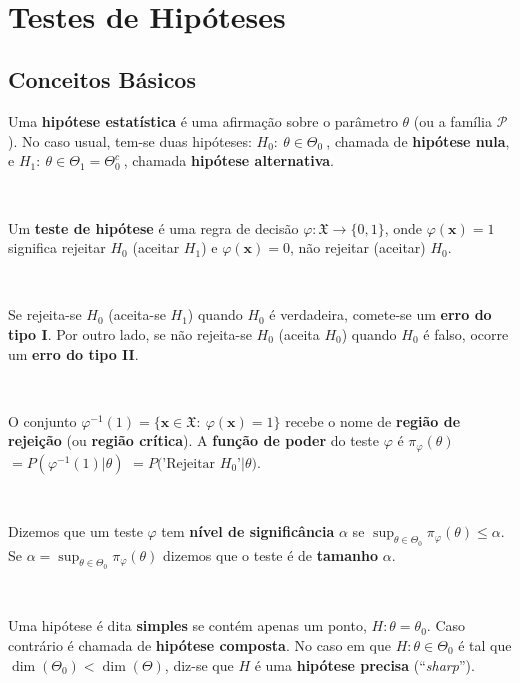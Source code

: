 \documentclass[
]{book}
\begin{document}
\(~\)

\hypertarget{Test}{%
\chapter{Testes de Hipóteses}\label{Test}}

\hypertarget{BasTest}{%
\section{Conceitos Básicos}\label{BasTest}}

Uma \textbf{hipótese estatística} é uma afirmação sobre o parâmetro \(\theta\) (ou a família \(\mathcal{P}\)). No caso usual, tem-se duas hipóteses: \(H_0: ~\theta\in\Theta_0~\), chamada de \textbf{hipótese nula}, e \(H_1: ~\theta\in\Theta_1={\Theta}_0^c~\), chamada \textbf{hipótese alternativa}.

\(~\)

Um \textbf{teste de hipótese} é uma regra de decisão \(\varphi: \mathfrak{X} \longrightarrow \{0,1\}\), onde \(\varphi(\boldsymbol{x})=1\) significa rejeitar \(H_0\) (aceitar \(H_1\)) e \(\varphi(\boldsymbol x)=0\), não rejeitar (aceitar) \(H_0\).

\(~\)

Se rejeita-se \(H_0\) (aceita-se \(H_1\)) quando \(H_0\) é verdadeira, comete-se um \textbf{erro do tipo I}. Por outro lado, se não rejeita-se \(H_0\) (aceita \(H_0\)) quando \(H_0\) é falso, ocorre um \textbf{erro do tipo II}.

\(~\)

O conjunto \(\varphi^{-1}(1)=\{\boldsymbol{x} \in \mathfrak{X} :~ \varphi(\boldsymbol{x})=1\}\) recebe o nome de \textbf{região de rejeição} (ou \textbf{região crítica}). A \textbf{função de poder} do teste \(\varphi\) é
\({\pi}_\varphi(\theta)\) \(=P\left(\varphi^{-1}(1)|\theta\right)\)
\(=P\big(\text{'Rejeitar $H_0$'} | \theta\big)\).

\(~\)

Dizemos que um teste \(\varphi\) tem \textbf{nível de significância} \(\alpha\) se \(\displaystyle\sup_{\theta\in\Theta_0}\pi_\varphi(\theta)\leq \alpha\). Se \(\alpha=\displaystyle\sup_{\theta\in\Theta_0}\pi_\varphi(\theta)\) dizemos que o teste é de \textbf{tamanho} \(\alpha\).

\(~\)

Uma hipótese é dita \textbf{simples} se contém apenas um ponto, \(H:\theta=\theta_0\). Caso contrário é chamada de \textbf{hipótese composta}. No caso em que \(H:\theta\in\Theta_0\) é tal que \(\dim(\Theta_0)<\dim(\Theta)\), diz-se que \(H\) é uma \textbf{hipótese precisa} (``\emph{sharp}'').
\end{document}
